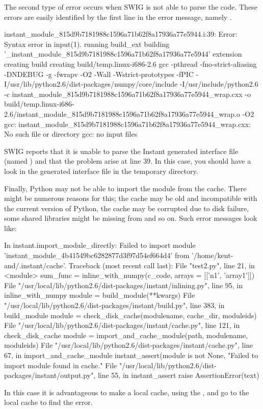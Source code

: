 The second type of error occurs when SWIG is not able to parse the code. These errors  
are easily identified by the first line in the error message, namely 
. 
\begin{python}
instant_module_815d9b7181988c1596a71b62f8a17936a77e5944.i:39: Error: Syntax error in input(1).
running build_ext
building '_instant_module_815d9b7181988c1596a71b62f8a17936a77e5944' extension
creating build
creating build/temp.linux-i686-2.6
gcc -pthread -fno-strict-aliasing -DNDEBUG -g -fwrapv -O2 -Wall -Wstrict-prototypes -fPIC 
   -I/usr/lib/python2.6/dist-packages/numpy/core/include -I/usr/include/python2.6 
   -c instant_module_815d9b7181988c1596a71b62f8a17936a77e5944_wrap.cxx 
   -o build/temp.linux-i686-2.6/instant_module_815d9b7181988c1596a71b62f8a17936a77e5944_wrap.o -O2
gcc: instant_module_815d9b7181988c1596a71b62f8a17936a77e5944_wrap.cxx: No such file or directory
gcc: no input files
\end{python}
SWIG reports that it is unable to parse the Instant generated interface file (named ) 
and that the problem arise at line 39.  In this case, you should have a look in the 
generated interface file in the temporary directory. 

Finally, Python may not be able to import the module from the cache. There might be numerous reasons for this; 
the cache may be old and incompatible with the current version of Python, the cache may be corrupted due 
to disk failure, some shared libraries might be missing from  and so on. 
Such error messages look like: 
\begin{python}
In instant.import_module_directly: 
Failed to import module 'instant_module_4b41549bc6282877d3f97d54ef664d4' from '/home/kent-and/.instant/cache'.
Traceback (most recent call last):
  File "test2.py", line 21, in <module>
    sum_func = inline_with_numpy(c_code, arrays = [['n1', 'array1']])
  File "/usr/local/lib/python2.6/dist-packages/instant/inlining.py", line 95, in inline_with_numpy
    module = build_module(**kwargs)
  File "/usr/local/lib/python2.6/dist-packages/instant/build.py", line 383, in build_module
    module = check_disk_cache(modulename, cache_dir, moduleids)
  File "/usr/local/lib/python2.6/dist-packages/instant/cache.py", line 121, in check_disk_cache
    module = import_and_cache_module(path, modulename, moduleids)
  File "/usr/local/lib/python2.6/dist-packages/instant/cache.py", line 67, in import_and_cache_module
    instant_assert(module is not None, "Failed to import module found in cache."
  File "/usr/local/lib/python2.6/dist-packages/instant/output.py", line 55, in instant_assert
    raise AssertionError(text)
\end{python}
In this case it is advantageous to make a local cache, using the  , and go 
to the local cache to find the error.  

